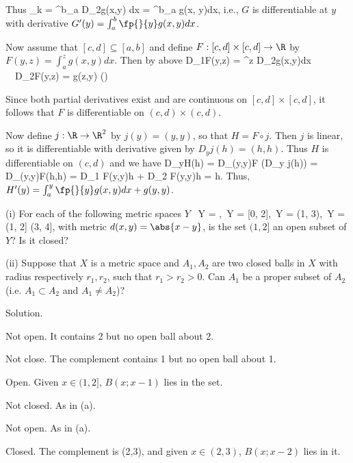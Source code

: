 Thus 
\be
\lim_{k}  = \int^b_a D_2g(x,y) dx = \int^b_a  g(x, y)dx,
\ee
i.e., $G$ is differentiable at $y$ with derivative $G'(y) = \int^b_a \fp{}{y} g(x, y)dx$.

Now assume that $[c,d]\subseteq [a,b]$ and define $F:[c,d]\times [c,d]\to \R$ by $F(y,z) = \int^z_a g(x,y)dx$. Then by above
\be
D_1F(y,z) = \int^z D_2g(x,y)dx \ \ra \ D_2F(y,z) = g(z,y) \quad\quad ()
\ee

Since both partial derivatives exist and are continuous on $[c,d]\times [c,d]$, it follows that $F$ is differentiable on $(c,d)\times (c,d)$.

Now define $j:\R\to \R^2$ by $j(y) = (y,y)$, so that $H=F\circ j$. Then $j$ is linear, so it is differentiable with derivative given by $D_yj(h) = (h,h)$. Thus $H$ is differentiable on $(c,d)$ and we have
\be
D_yH(h) = D_{(y,y)}F (D_y j(h)) = D_{(y,y)}F(h,h) = D_1 F(y,y)h + D_2 F(y,y)h = h.
\ee
Thus, $H'(y) = \int^y_a \fp{}{y}g(x,y)dx + g(y,y)$.

\begin{exercise}
\ben
\item [(i)] For each of the following metric spaces $Y$
\be
{}\ Y = \R,\quad\quad {}\ Y = [0, 2],\quad\quad {}\ Y = (1, 3),\quad\quad {}\ Y = (1, 2] \cup (3, 4],
\ee
with metric $d(x, y) = \abs{x - y}$, is the set $(1, 2]$ an open subset of $Y$? Is it closed?

\item [(ii)] Suppose that $X$ is a metric space and $A_1,A_2$ are two closed balls in $X$ with radius respectively $r_1, r_2$, such that $r_1 > r_2 > 0$. Can $A_1$ be a proper subset of $A_2$ (i.e. $A_1 \subset A_2$ and $A_1 \neq A_2$)?
\een
\end{exercise}

Solution. \ben
\item [(i)] \ben 
\item [(a)] Not open. It contains 2 but no open ball about 2.

Not close. The complement contains 1 but no open ball about 1.

\item [(b)] Open. Given $x\in(1,2]$, $B(x;x-1)$ lies in the set.

Not closed. As in (a).

\item [(c)] Not open. As in (a).

Closed. The complement is (2,3), and given $x\in (2,3)$, $B(x;x-2)$ lies in it.

